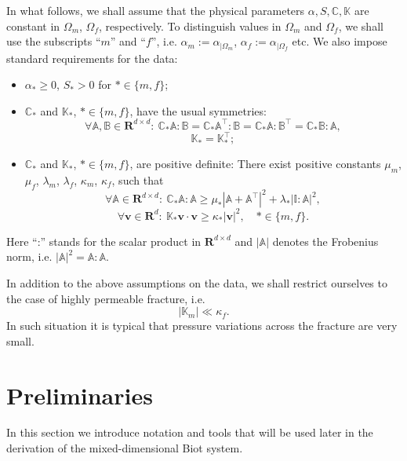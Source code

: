 \documentclass[a4paper]{article}
\numberwithin{equation}{section}
\def\CC{\tn C}
\def\Real{{\mathbf R}} %
\def\tn#1{{\mathbb{#1}}}    %
\def\vc#1{\mathbf{#1}}     %
\def\vv{\vc v}
\newcommand{\eq}[1]{\begin{equation}#1\end{equation}}
\newcommand{\eqs}[1]{\begin{equation*}#1\end{equation*}}
\begin{document}
In what follows, we shall assume that the physical parameters $\alpha,S,\CC,\tn K$ are constant in $\Omega_m$, $\Omega_f$, respectively.
To distinguish values in $\Omega_m$ and $\Omega_f$, we shall use the subscripts ``$m$'' and ``$f$'', i.e. $\alpha_m := \alpha_{|\Omega_m}$, $\alpha_f := \alpha_{|\Omega_f}$ etc.
We also impose standard requirements for the data:
\begin{itemize}
\item $\alpha_*\ge 0$, $S_*>0$ for $*\in\{m,f\}$;
\item $\CC_*$ and $\tn K_*$, $*\in\{m,f\}$, have the usual symmetries:
\eqs{ \forall \tn A,\tn B\in\Real^{d\times d}:~ \CC_*\tn A:\tn B=\CC_*\tn A^\top:\tn B=\CC_*\tn A:\tn B^\top=\CC_*\tn B:\tn A, }
\eqs{ \tn K_* = \tn K_*^\top; }
\item $\CC_*$ and $\tn K_*$, $*\in\{m,f\}$, are positive definite: %
There exist positive constants $\mu_m$, $\mu_f$, $\lambda_m$, $\lambda_f$, $\kappa_m$, $\kappa_f$, such that
\eq{ \label{eq:pos_def_C_gen} \forall\tn A\in\Real^{d\times d}:~\CC_*\tn A:\tn A \ge \mu_*\left|\tn A+\tn A^\top\right|^2 + \lambda_*|\tn I:\tn A|^2, }
\eq{ \label{eq:pos_def_K} \forall\vv\in\Real^d:~\tn K_*\vv\cdot\vv \ge \kappa_*|\vv|^2,\quad *\in\{m,f\}. }
\end{itemize}
Here ``:'' stands for the scalar product in $\Real^{d\times d}$ and $|\tn A|$ denotes the Frobenius norm, i.e. $|\tn A|^2=\tn A:\tn A$.

In addition to the above assumptions on the data, we shall restrict ourselves to the case of highly permeable fracture, i.e.
\eq{\label{eq:asm_permeable_frac} |\tn K_m|\ll \kappa_f. }
In such situation it is typical that pressure variations across the fracture are very small.



\section{Preliminaries}\label{sec:calculus}

In this section we introduce notation and tools that will be used later in the derivation of the mixed-dimensional Biot system.
\end{document}
